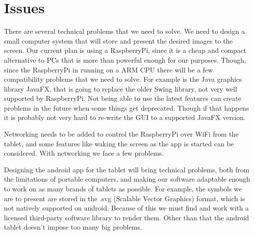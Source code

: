 \documentclass[12pt,a4paper,notitlepage]{report}
\begin{document}





\section{Issues} %
There are several technical problems that we need to solve. We need to design a small computer system that will store and present the desired images to the screen. Our current plan is using a RaspberryPi, since it is a cheap and compact alternative to PCs that is more than powerful enough for our purposes. Though, since the RaspberryPi in running on a ARM CPU there will be a few compatibility problems that we need to solve. For example is the Java graphics library JavaFX, that is going to replace the older Swing library, not very well supported by RaspberryPi. Not being able to use the latest features can create problems in the future when some things get deprecated. Though if that happens it is probably not very hard to re-write the GUI to a supported JavaFX version.

Networking needs to be added to control the RaspberryPi over WiFi from the tablet, and some features like waking the screen as the app is started can be considered. With networking we face a few problems. %

Designing the android app for the tablet will bring technical problems, both from the limitations of portable computers, and making our software adaptable enough to work on as many brands of tablets as possible. For example, the symbols we are to present are stored in the .svg (Scalable Vector Graphics) format, which is not natively supported on android. Because of this we must find and work with a licensed third-party software library to render them. Other than that the android tablet doesn't impose too many big problems. %
\end{document}
